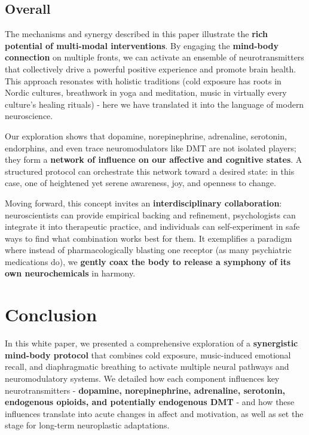 \documentclass[11pt]{article}
\begin{document}
\subsection{Overall}

The mechanisms and synergy described in this paper illustrate the \textbf{rich potential of multi-modal interventions}. By engaging the \textbf{mind-body connection} on multiple fronts, we can activate an ensemble of neurotransmitters that collectively drive a powerful positive experience and promote brain health. This approach resonates with holistic traditions (cold exposure has roots in Nordic cultures, breathwork in yoga and meditation, music in virtually every culture's healing rituals) - here we have translated it into the language of modern neuroscience.

Our exploration shows that dopamine, norepinephrine, adrenaline, serotonin, endorphins, and even trace neuromodulators like DMT are not isolated players; they form a \textbf{network of influence on our affective and cognitive states}. A structured protocol can orchestrate this network toward a desired state: in this case, one of heightened yet serene awareness, joy, and openness to change.

Moving forward, this concept invites an \textbf{interdisciplinary collaboration}: neuroscientists can provide empirical backing and refinement, psychologists can integrate it into therapeutic practice, and individuals can self-experiment in safe ways to find what combination works best for them. It exemplifies a paradigm where instead of pharmacologically blasting one receptor (as many psychiatric medications do), we \textbf{gently coax the body to release a symphony of its own neurochemicals} in harmony.


\section{Conclusion}

In this white paper, we presented a comprehensive exploration of a \textbf{synergistic mind-body protocol}
 that combines cold exposure, music-induced emotional recall, and diaphragmatic breathing to activate multiple neural pathways and neuromodulatory systems. We detailed how each component influences key neurotransmitters - \textbf{dopamine, norepinephrine, adrenaline, serotonin, endogenous opioids, and potentially endogenous DMT} - and how these influences translate into acute changes in affect and motivation, as well as set the stage for long-term neuroplastic adaptations.
\end{document}

